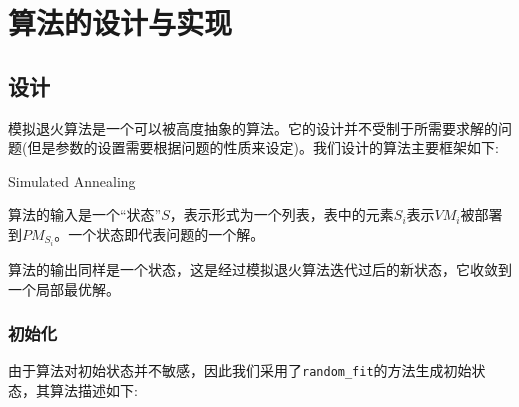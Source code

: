 
\chapter{算法的设计与实现}
\label{chap:algo}

\section{设计}
\label{sec:design}
模拟退火算法是一个可以被高度抽象的算法。它的设计并不受制于所需要求解的问题(但是参数的设置需要根据问题的性质来设定)。我们设计的算法主要框架如下:

\begin{algorithm}[H]
  \DontPrintSemicolon
  
  \caption{Simulated Annealing\label{algo:SA}}
\end{algorithm}

算法的输入是一个``状态''$S$，表示形式为一个列表，表中的元素$S_i$表示$VM_i$被部署到$PM_{S_i}$。一个状态即代表问题的一个解。

算法的输出同样是一个状态，这是经过模拟退火算法迭代过后的新状态，它收敛到一个局部最优解。

\subsection{初始化}
\label{sec:init}

由于算法对初始状态并不敏感，因此我们采用了\texttt{random\_fit}的方法生成初始状态，其算法描述如下:

